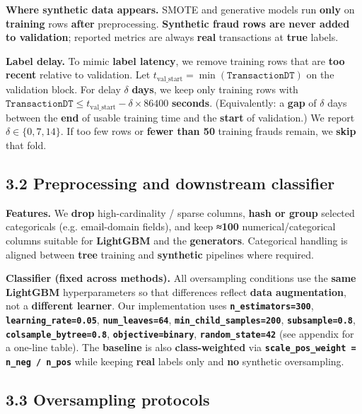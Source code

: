 \documentclass[sigconf]{acmart}
\begin{document}
{{\textbf{Where synthetic data appears.} SMOTE and generative models run \textbf{only} on \textbf{training} rows \textbf{after} preprocessing. \textbf{Synthetic fraud rows are never added to validation}; reported metrics are always \textbf{real} transactions at \textbf{true} labels.

\textbf{Label delay.} To mimic \textbf{label latency}, we remove training rows that are \textbf{too recent} relative to validation. Let \(t_{\mathrm{val\_start}} = \min(\texttt{TransactionDT})\) on the validation block. For delay \(\delta\) \textbf{days}, we keep only training rows with \(\texttt{TransactionDT} \le t_{\mathrm{val\_start}} - \delta \times 86400\) \textbf{seconds}. (Equivalently: a \textbf{gap} of \(\delta\) days between the \textbf{end} of usable training time and the \textbf{start} of validation.) We report \(\delta \in \{0, 7, 14\}\). If too few rows or \textbf{fewer than 50} training frauds remain, we \textbf{skip} that fold.

\subsection{3.2 Preprocessing and downstream classifier}

\textbf{Features.} We \textbf{drop} high-cardinality / sparse columns, \textbf{hash or group} selected categoricals (e.g. email-domain fields), and keep \textbf{≈100} numerical/categorical columns suitable for \textbf{LightGBM} and the \textbf{generators}. Categorical handling is aligned between \textbf{tree} training and \textbf{synthetic} pipelines where required.

\textbf{Classifier (fixed across methods).} All oversampling conditions use the \textbf{same} \textbf{LightGBM} hyperparameters so that differences reflect \textbf{data augmentation}, not a \textbf{different learner}. Our implementation uses \textbf{\texttt{n_estimators=300}}, \textbf{\texttt{learning_rate=0.05}}, \textbf{\texttt{num_leaves=64}}, \textbf{\texttt{min_child_samples=200}}, \textbf{\texttt{subsample=0.8}}, \textbf{\texttt{colsample_bytree=0.8}}, \textbf{\texttt{objective=binary}}, \textbf{\texttt{random_state=42}} (see appendix for a one-line table). The \textbf{baseline} is also \textbf{class-weighted} via \textbf{\texttt{scale_pos_weight = n_neg / n_pos}} while keeping \textbf{real} labels only and \textbf{no} synthetic oversampling.

\subsection{3.3 Oversampling protocols}

}}
\end{document}
